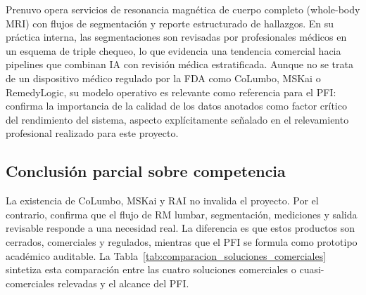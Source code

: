 Prenuvo opera servicios de resonancia magnética de cuerpo completo (whole-body MRI) con flujos de segmentación y reporte estructurado de hallazgos. En su práctica interna, las segmentaciones son revisadas por profesionales médicos en un esquema de triple chequeo, lo que evidencia una tendencia comercial hacia pipelines que combinan IA con revisión médica estratificada. Aunque no se trata de un dispositivo médico regulado por la FDA como CoLumbo, MSKai o RemedyLogic, su modelo operativo es relevante como referencia para el PFI: confirma la importancia de la calidad de los datos anotados como factor crítico del rendimiento del sistema, aspecto explícitamente señalado en el relevamiento profesional realizado para este proyecto.

\subsection{Conclusión parcial sobre competencia}

La existencia de CoLumbo, MSKai y RAI no invalida el proyecto. Por el contrario, confirma que el flujo de RM lumbar, segmentación, mediciones y salida revisable responde a una necesidad real. La diferencia es que estos productos son cerrados, comerciales y regulados, mientras que el PFI se formula como prototipo académico auditable. La Tabla~\ref{tab:comparacion_soluciones_comerciales} sintetiza esta comparación entre las cuatro soluciones comerciales o cuasi-comerciales relevadas y el alcance del PFI.

